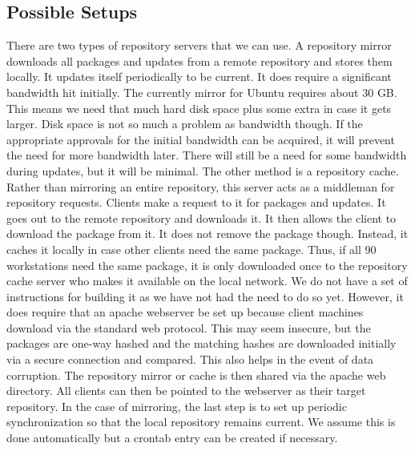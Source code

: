 \subsection{Possible Setups}
There are two types of repository servers that we can use.  A repository mirror downloads all packages and updates from a remote repository and stores them locally.  It updates itself periodically to be current.  It does require a significant bandwidth hit initially.  The currently mirror for Ubuntu requires about 30 GB.  This means we need that much hard disk space plus some extra in case it gets larger.  Disk space is not so much a problem as bandwidth though.  If the appropriate approvals for the initial bandwidth can be acquired, it will prevent the need for more bandwidth later.  There will still be a need for some bandwidth during updates, but it will be minimal.  
The other method is a repository cache.  Rather than mirroring an entire repository, this server acts as a middleman for repository requests.  Clients make a request to it for packages and updates.  It goes out to the remote repository and downloads it.  It then allows the client to download the package from it.  It does not remove the package though.  Instead, it caches it locally in case other clients need the same package.  Thus, if all 90 workstations need the same package, it is only downloaded once to the repository cache server who makes it available on the local network.  
We do not have a set of instructions for building it as we have not had the need to do so yet.  However, it does require that an apache webserver be set up because client machines download via the standard web protocol.  This may seem insecure, but the packages are one-way hashed and the matching hashes are downloaded initially via a secure connection and compared.  This also helps in the event of data corruption.  The repository mirror or cache is then shared via the apache web directory.  All clients can then be pointed to the webserver as their target repository.  In the case of mirroring, the last step is to set up periodic synchronization so that the local repository remains current.  We assume this is done automatically but a crontab entry can be created if necessary.
